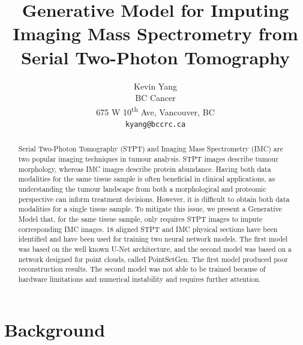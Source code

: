 \documentclass[10pt,twocolumn,letterpaper]{article}
\begin{document}
\title{Generative Model for Imputing Imaging Mass Spectrometry from Serial Two-Photon Tomography}

\author{Kevin Yang\\
BC Cancer\\
675 W 10\textsuperscript{th} Ave, Vancouver, BC\\
{\tt\small kyang@bccrc.ca}
}
\maketitle

\begin{abstract}
Serial Two-Photon Tomography (STPT) and Imaging Mass Spectrometry (IMC) are two popular imaging techniques in tumour analysis. STPT images describe tumour morphology, whereas IMC images describe protein abundance. Having both data modalities for the same tissue sample is often beneficial in clinical applications, as understanding the tumour landscape from both a morphological and proteomic perspective can inform treatment decisions. However, it is difficult to obtain both data modalities for a single tissue sample. To mitigate this issue, we present a Generative Model that, for the same tissue sample, only requires STPT images to impute corresponding IMC images. 18 aligned STPT and IMC physical sections have been identified and have been used for training two neural network models. The first model was based on the well known U-Net architecture, and the second model was based on a network designed for point clouds, called PointSetGen. The first model produced poor reconstruction results. The second model was not able to be trained because of hardware limitations and numerical instability and requires further attention.
\end{abstract}

\section{Background}
\label{sec:background}
\end{document}
